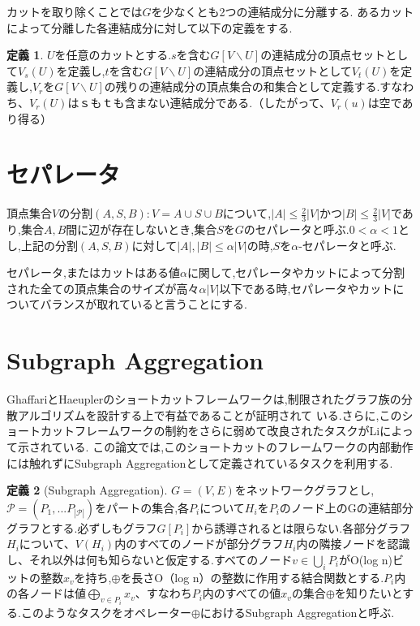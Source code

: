 \documentclass{thesis}
\theoremstyle{definition}
\newtheorem{definition}{定義}
\begin{document}
カットを取り除くことでは$G$を少なくとも2つの連結成分に分離する.
あるカットによって分離した各連結成分に対して以下の定義をする.

\begin{definition}
    $U$を任意のカットとする.$s$を含む$G[V\backslash U]$の連結成分の頂点セットとして$V_s(U)$を定義し,$t$を含む$G [V\backslash U]$の連結成分の頂点セットとして$V_t(U)$を定義し,$V_r$を$G [V \backslash U]$の残りの連結成分の頂点集合の和集合として定義する.すなわち、$V_r(U)$は$ｓ$も$ｔ$も含まない連結成分である.（したがって、$V_r(u)$は空であり得る）
\end{definition}

\section{セパレータ}
頂点集合$V$の分割$(A,S,B):V=A \cup S \cup B$について,$|A|\leq \frac{2}{3}|V|$かつ$|B|\leq \frac{2}{3}|V|$であり,集合$A,B$間に辺が存在しないとき,集合$S$を$G$のセパレータと呼ぶ.$0 <\alpha < 1$とし,上記の分割$(A,S,B)$に対して$|A|,|B|\leq \alpha|V|$の時,$S$を$\alpha$-セパレータと呼ぶ.\par
セパレータ,またはカットはある値$\alpha$に関して,セパレータやカットによって分割された全ての頂点集合のサイズが高々$\alpha |V|$以下である時,セパレータやカットについてバランスが取れていると言うことにする.

\section{Subgraph Aggregation}
GhaffariとHaeupler\cite{ghaffari2016distributed}のショートカットフレームワークは,制限されたグラフ族の分散アルゴリズムを設計する上で有益であることが証明されて
いる.さらに,このショートカットフレームワークの制約をさらに弱めて改良されたタスクがLi\cite{li2018distributed}によって示されている.
この論文では,このショートカットのフレームワークの内部動作には触れずにSubgraph Aggregationとして定義されているタスクを利用する.

\begin{definition}[Subgraph Aggregation\cite{li2018distributed}\cite{haeupler2018round}]
    $G=(V,E)$をネットワークグラフとし,$\mathcal{P} =(P_1,...P_{|\mathcal{P}|})$をパートの集合,各$P_i$について$H_i$を$P_i$のノード上のGの連結部分グラフとする.必ずしもグラフ$G[P_i]$から誘導されるとは限らない.各部分グラフ$H_i$について、$V(H_i)$内のすべてのノードが部分グラフ$H_i$内の隣接ノードを認識し、それ以外は何も知らないと仮定する.すべてのノード$v\in \bigcup_iP_i$がO(log n)ビットの整数$x_v$を持ち,$\oplus$を長さO（log n）の整数に作用する結合関数とする.$P_i$内の各ノードは値$\bigoplus_{v\in P_i}x_v$、すなわち$P_i$内のすべての値$x_v$の集合$\oplus$を知りたいとする.このようなタスクをオペレーター$\oplus$におけるSubgraph Aggregationと呼ぶ.
\end{definition}
\end{document}
